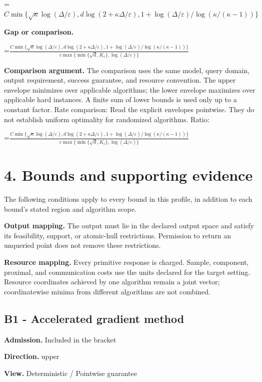 \documentclass[10pt,a4paper]{article}
\newcommand{\AtlasMath}[1]{\par\begingroup\centering\setbox0=\hbox{$\displaystyle #1$}\ifdim\wd0>1.4\linewidth\typeout{ATLAS WIDE FORMULA: \the\wd0}\fi\ifdim\wd0>\linewidth\resizebox{\linewidth}{!}{\box0}\else\box0\fi\par\endgroup}
\begin{document}
\AtlasMath{C\min\{\sqrt\kappa\log(\Delta/\varepsilon),d\log(2+\kappa\Delta/\varepsilon),1+\log(\Delta/\varepsilon)/\log(\kappa/(\kappa-1))\}}
\textbf{Gap or comparison.} 
\AtlasMath{\frac{C\min\{\sqrt\kappa\log(\Delta/\varepsilon),d\log(2+\kappa\Delta/\varepsilon),1+\log(\Delta/\varepsilon)/\log(\kappa/(\kappa-1))\}}{c\max\{\min\{\sqrt d,K_\varepsilon\},\log(\Delta/\varepsilon)\}}}


\textbf{Comparison argument.} The comparison uses the same model, query domain, output requirement, success guarantee, and resource convention. The upper envelope minimizes over applicable algorithms; the lower envelope maximizes over applicable hard instances. A finite sum of lower bounds is used only up to a constant factor. Rate comparison: Read the explicit envelopes pointwise. They do not establish uniform optimality for randomized algorithms. Ratio: 
\AtlasMath{\frac{C\min\{\sqrt\kappa\log(\Delta/\varepsilon),d\log(2+\kappa\Delta/\varepsilon),1+\log(\Delta/\varepsilon)/\log(\kappa/(\kappa-1))\}}{c\max\{\min\{\sqrt d,K_\varepsilon\},\log(\Delta/\varepsilon)\}}}


\section{4. Bounds and supporting evidence}
The following conditions apply to every bound in this profile, in addition to each bound's stated region and algorithm scope.

\textbf{Output mapping.} The output must lie in the declared output space and satisfy its feasibility, support, or atomic-hull restrictions. Permission to return an unqueried point does not remove these restrictions.

\textbf{Resource mapping.} Every primitive response is charged. Sample, component, proximal, and communication costs use the units declared for the target setting. Resource coordinates achieved by one algorithm remain a joint vector; coordinatewise minima from different algorithms are not combined.

\subsection{B1 - Accelerated gradient method}
\textbf{Admission.} Included in the bracket

\textbf{Direction.} upper

\textbf{View.} Deterministic / Pointwise guarantee
\end{document}
